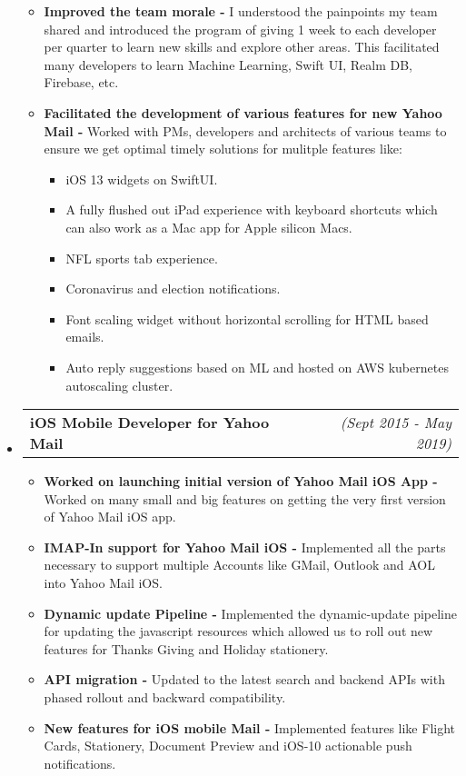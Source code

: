 \documentclass[a4paper,11pt,times]{res}
\makeatletter
\newcommand{\smalitem}[1]{\item #1 \vspace{-4pt}}
\newcommand{\mysubheading}[2]{
\begin{tabular*}{172mm}{l@{\extracolsep{\fill}}r}
		\textbf{#1} & \textit{#2} \\
\end{tabular*}\vspace{-1pt}}
\makeatother
\begin{document}
\begin{itemize}
\begin{itemize}
\smalitem{\textbf{Improved the team morale -} I understood the painpoints my team shared and introduced the program of giving 1 week to each developer per quarter to learn new skills and explore other areas. This facilitated many developers to learn Machine Learning, Swift UI, Realm DB, Firebase, etc.}
\smalitem{\textbf{Facilitated the development of various features for new Yahoo Mail -} Worked with PMs, developers and architects of various teams to ensure we get optimal timely solutions for mulitple features like:
\begin{itemize}
\smalitem {iOS 13 widgets on SwiftUI.}
\smalitem {A fully flushed out iPad experience with keyboard shortcuts which can also work as a Mac app for Apple silicon Macs.}
\smalitem {NFL sports tab experience.}
\smalitem {Coronavirus and election notifications.}
\smalitem {Font scaling widget without horizontal scrolling for HTML based emails.}
\smalitem {Auto reply suggestions based on ML and hosted on AWS kubernetes autoscaling cluster.}
\end{itemize}
 }

\end{itemize}

\vspace{2pt}

\item
\mysubheading{iOS Mobile Developer for Yahoo Mail }{(Sept 2015 - May 2019)}
\begin{itemize}
\vspace{-2pt}
\smalitem{\textbf{Worked on launching initial version of Yahoo Mail iOS App -} Worked on many small and big features on getting the very first version of Yahoo Mail iOS app.}
\smalitem{\textbf{IMAP-In support for Yahoo Mail iOS -} Implemented all the parts necessary to support multiple Accounts like GMail, Outlook and AOL into Yahoo Mail iOS.}
\smalitem{\textbf{Dynamic update Pipeline -} Implemented the dynamic-update pipeline for updating the javascript resources which allowed us to roll out new features for Thanks Giving and Holiday stationery.}
\smalitem{\textbf{API migration -} Updated to the latest search and backend APIs with phased rollout and backward compatibility.}
\smalitem{\textbf{New features for iOS mobile Mail -} Implemented features like Flight Cards, Stationery, Document Preview and iOS-10 actionable push notifications.}

\end{itemize}

\vspace{10pt}


\end{itemize}
\end{document}
